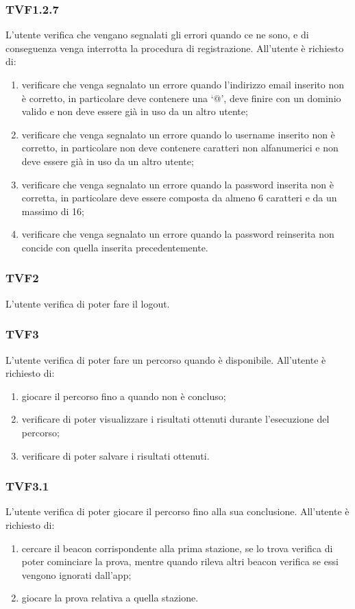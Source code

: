 		\subsubsection{TVF1.2.7}
			L'utente verifica che vengano segnalati gli errori quando ce ne sono, e di conseguenza venga interrotta la procedura di registrazione.
			All'utente è richiesto di:
			\begin{enumerate}
				\item verificare che venga segnalato un errore quando l'indirizzo email inserito non è corretto, in particolare deve contenere una `@', deve finire con un dominio valido e non deve essere già in uso da un altro utente;
				\item verificare che venga segnalato un errore quando lo username inserito non è corretto, in particolare non deve contenere caratteri non alfanumerici e non deve essere già in uso da un altro utente;
				\item verificare che venga segnalato un errore quando la password inserita non è corretta, in particolare deve essere composta da almeno 6 caratteri e da un massimo di 16;
				\item verificare che venga segnalato un errore quando la password reinserita non concide con quella inserita precedentemente.
			\end{enumerate}
		\subsubsection{TVF2}
			L'utente verifica di poter fare il logout.
		\subsubsection{TVF3}
			L'utente verifica di poter fare un percorso quando è disponibile.
			All'utente è richiesto di:
			\begin{enumerate}
				\item giocare il percorso fino a quando non è concluso;
				\item verificare di poter visualizzare i risultati ottenuti durante l'esecuzione del percorso;
				\item verificare di poter salvare i risultati ottenuti.
			\end{enumerate}
		\subsubsection{TVF3.1}
			L'utente verifica di poter giocare il percorso fino alla sua conclusione.
			All'utente è richiesto di:
			\begin{enumerate}
				\item cercare il beacon corrispondente alla prima stazione, se lo trova verifica di poter cominciare la prova, mentre quando rileva altri beacon verifica se essi vengono ignorati dall'app;
				\item giocare la prova relativa a quella stazione.
			\end{enumerate}
